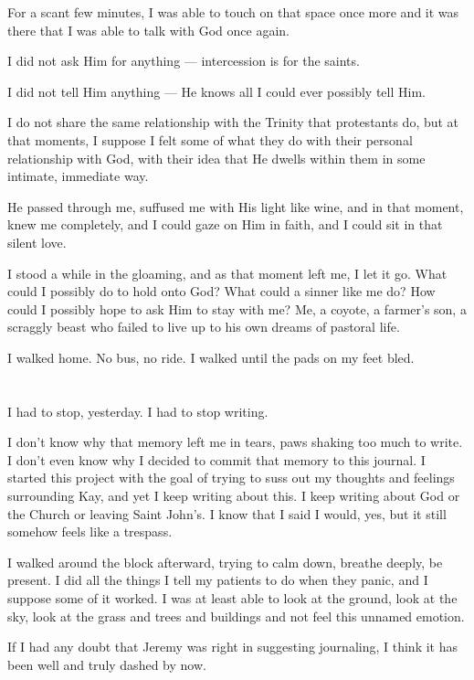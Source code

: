 For a scant few minutes, I was able to touch on that space once more and it was there that I was able to talk with God once again.

I did not ask Him for anything --- intercession is for the saints.

I did not tell Him anything --- He knows all I could ever possibly tell Him.

I do not share the same relationship with the Trinity that protestants do, but at that moments, I suppose I felt some of what they do with their personal relationship with God, with their idea that He dwells within them in some intimate, immediate way.

He passed through me, suffused me with His light like wine, and in that moment, knew me completely, and I could gaze on Him in faith, and I could sit in that silent love.

I stood a while in the gloaming, and as that moment left me, I let it go. What could I possibly do to hold onto God? What could a sinner like me do? How could I possibly hope to ask Him to stay with me? Me, a coyote, a farmer's son, a scraggly beast who failed to live up to his own dreams of pastoral life.

I walked home. No bus, no ride. I walked until the pads on my feet bled.

\section{}

I had to stop, yesterday. I had to stop writing.

I don't know why that memory left me in tears, paws shaking too much to write. I don't even know why I decided to commit that memory to this journal. I started this project with the goal of trying to suss out my thoughts and feelings surrounding Kay, and yet I keep writing about this. I keep writing about God or the Church or leaving Saint John's. I know that I said I would, yes, but it still somehow feels like a trespass.

I walked around the block afterward, trying to calm down, breathe deeply, be present. I did all the things I tell my patients to do when they panic, and I suppose some of it worked. I was at least able to look at the ground, look at the sky, look at the grass and trees and buildings and not feel this unnamed emotion.

If I had any doubt that Jeremy was right in suggesting journaling, I think it has been well and truly dashed by now.


